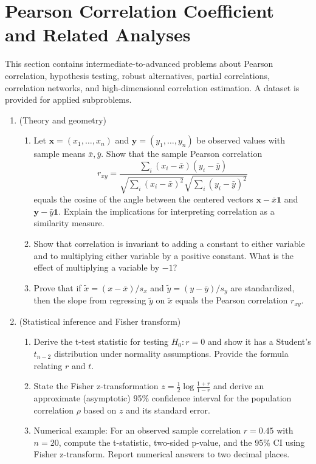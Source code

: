 \documentclass[12pt,a4paper]{article}
\begin{document}


\section{Pearson Correlation Coefficient and Related Analyses}
This section contains intermediate-to-advanced problems about Pearson correlation, hypothesis testing, robust alternatives, partial correlations, correlation networks, and high-dimensional correlation estimation. A dataset is provided for applied subproblems.
\begin{enumerate}[label=(\arabic*)]
\item (Theory and geometry)
    \begin{enumerate}[label=(\alph*)]
    \item Let \(\mathbf{x}=(x_1,\dots,x_n)\) and \(\mathbf{y}=(y_1,\dots,y_n)\) be observed values with sample means \(\bar x,\bar y\). Show that the sample Pearson correlation
    \[ r_{xy}=\frac{\sum_i (x_i-\bar x)(y_i-\bar y)}{\sqrt{\sum_i (x_i-\bar x)^2}\sqrt{\sum_i (y_i-\bar y)^2}}\]
    equals the cosine of the angle between the centered vectors \(\mathbf{x}-\bar x\mathbf{1}\) and \(\mathbf{y}-\bar y\mathbf{1}\). Explain the implications for interpreting correlation as a similarity measure.
    \item Show that correlation is invariant to adding a constant to either variable and to multiplying either variable by a positive constant. What is the effect of multiplying a variable by \(-1\)?
    \item Prove that if \(\tilde x=(x-\bar x)/s_x\) and \(\tilde y=(y-\bar y)/s_y\) are standardized, then the slope from regressing \(\tilde y\) on \(\tilde x\) equals the Pearson correlation \(r_{xy}\).
    \end{enumerate}

\item (Statistical inference and Fisher transform)
    \begin{enumerate}[label=(\alph*)]
    \item Derive the t-test statistic for testing \(H_0:r=0\) and show it has a Student's \(t_{n-2}\) distribution under normality assumptions. Provide the formula relating \(r\) and \(t\).
    \item State the Fisher z-transformation \(z=\tfrac{1}{2}\log\tfrac{1+r}{1-r}\) and derive an approximate (asymptotic) 95\% confidence interval for the population correlation \(\rho\) based on \(z\) and its standard error.
    \item Numerical example: For an observed sample correlation \(r=0.45\) with \(n=20\), compute the t-statistic, two-sided p-value, and the 95\% CI using Fisher z-transform. Report numerical answers to two decimal places.
    \end{enumerate}


\end{enumerate}
\end{document}
